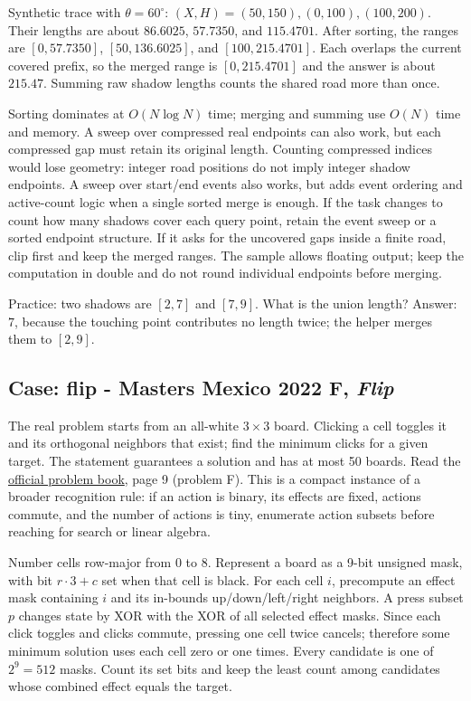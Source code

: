 Synthetic trace with $\theta=60^\circ$:
$(X,H)=(50,150),(0,100),(100,200)$. Their lengths are about $86.6025$,
$57.7350$, and $115.4701$. After sorting, the ranges are
$[0,57.7350]$, $[50,136.6025]$, and $[100,215.4701]$. Each overlaps the
current covered prefix, so the merged range is $[0,215.4701]$ and the answer
is about $215.47$. Summing raw shadow lengths counts the shared road more
than once.

Sorting dominates at $O(N\log N)$ time; merging and summing use $O(N)$ time
and memory. A sweep over compressed real endpoints can also work, but each compressed
gap must retain its original length. Counting compressed indices would
lose geometry: integer road positions do not imply integer shadow endpoints. A sweep over start/end events also works, but adds
event ordering and active-count logic when a single sorted merge is enough.
If the task changes to count how many shadows cover each query point, retain
the event sweep or a sorted endpoint structure. If it asks for the uncovered
gaps inside a finite road, clip first and keep the merged ranges. The sample
allows floating output; keep the computation in double and do not round
individual endpoints before merging.

Practice: two shadows are $[2,7]$ and $[7,9]$. What is the union length?
Answer: $7$, because the touching point contributes no length twice; the
helper merges them to $[2,9]$.

\subsection{Case: flip - Masters Mexico 2022 F, \emph{Flip}}
\label{case:flip}

The real problem starts from an all-white $3\times3$ board. Clicking a cell
toggles it and its orthogonal neighbors that exist; find the minimum clicks
for a given target. The statement guarantees a solution and has at most 50
boards. Read the \href{https://acm.iteso.mx/share/ICPCMXMasters2022_problems.pdf}{official
problem book}, page 9 (problem F). This is a compact instance of a broader
recognition rule: if an action is binary, its effects are fixed, actions
commute, and the number of actions is tiny, enumerate action subsets before
reaching for search or linear algebra.

Number cells row-major from 0 to 8. Represent a board as a 9-bit unsigned
mask, with bit $r\cdot3+c$ set when that cell is black. For each cell $i$,
precompute an effect mask containing $i$ and its in-bounds up/down/left/right
neighbors. A press subset $p$ changes state by XOR with the XOR of all
selected effect masks. Since each click toggles and clicks commute, pressing
one cell twice cancels; therefore some minimum solution uses each cell zero
or one times. Every candidate is one of $2^9=512$ masks. Count its set bits
and keep the least count among candidates whose combined effect equals the
target.


